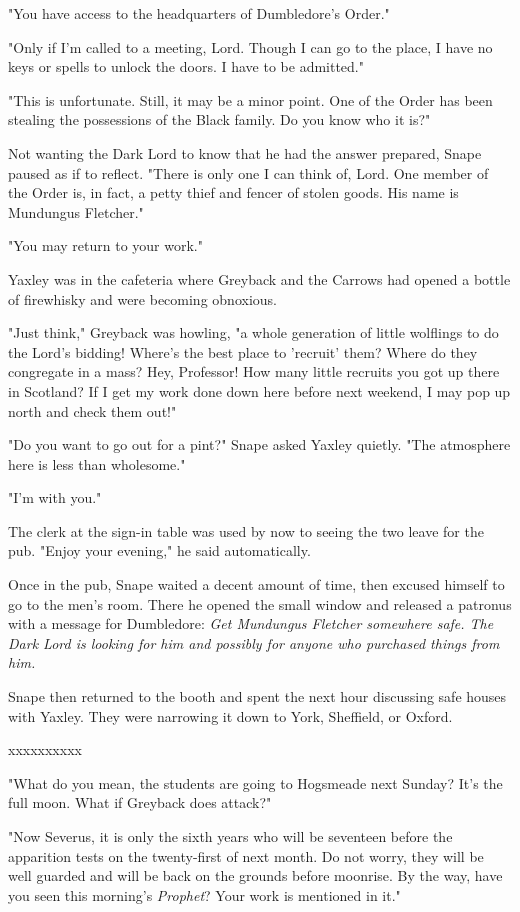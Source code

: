 \documentclass[a4paper,11pt]{article}
\begin{document}
"You have access to the headquarters of Dumbledore's Order."

"Only if I'm called to a meeting, Lord. Though I can go to the place, I have no keys or spells to unlock the doors. I have to be admitted."

"This is unfortunate. Still, it may be a minor point. One of the Order has been stealing the possessions of the Black family. Do you know who it is?"

Not wanting the Dark Lord to know that he had the answer prepared, Snape paused as if to reflect. "There is only one I can think of, Lord. One member of the Order is, in fact, a petty thief and fencer of stolen goods. His name is Mundungus Fletcher."

"You may return to your work."

Yaxley was in the cafeteria where Greyback and the Carrows had opened a bottle of firewhisky and were becoming obnoxious.

"Just think," Greyback was howling, "a whole generation of little wolflings to do the Lord's bidding! Where's the best place to 'recruit' them? Where do they congregate in a mass? Hey, Professor! How many little recruits you got up there in Scotland? If I get my work done down here before next weekend, I may pop up north and check them out!"

"Do you want to go out for a pint?" Snape asked Yaxley quietly. "The atmosphere here is less than wholesome."

"I'm with you."

The clerk at the sign-in table was used by now to seeing the two leave for the pub. "Enjoy your evening," he said automatically.

Once in the pub, Snape waited a decent amount of time, then excused himself to go to the men's room. There he opened the small window and released a patronus with a message for Dumbledore: \emph{Get Mundungus Fletcher somewhere safe. The Dark Lord is looking for him and possibly for anyone who purchased things from him.}

Snape then returned to the booth and spent the next hour discussing safe houses with Yaxley. They were narrowing it down to York, Sheffield, or Oxford.

xxxxxxxxxx

"What do you mean, the students are going to Hogsmeade next Sunday? It's the full moon. What if Greyback does attack?"

"Now Severus, it is only the sixth years who will be seventeen before the apparition tests on the twenty-first of next month. Do not worry, they will be well guarded and will be back on the grounds before moonrise. By the way, have you seen this morning's \emph{Prophet}? Your work is mentioned in it."
\end{document}
